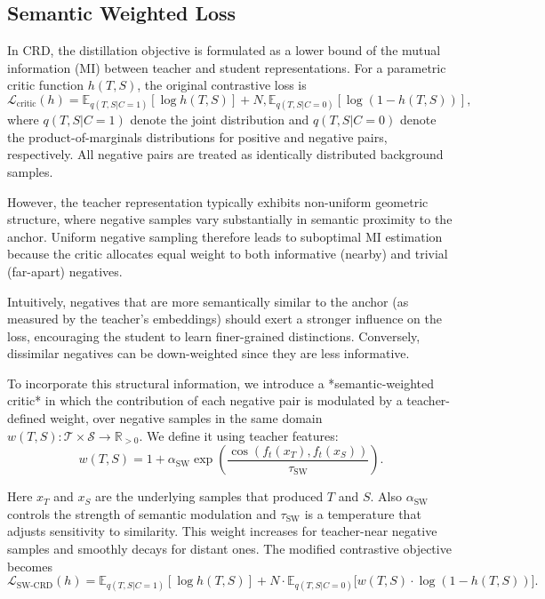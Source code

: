 \documentclass{article}
\theoremstyle{plain}
\theoremstyle{remark}
\begin{document}
\subsection{Semantic Weighted Loss}

In CRD, the distillation objective is formulated as a lower bound of the mutual information (MI) between teacher and student representations. For a parametric critic function $h(T,S)$, the original contrastive loss is
\begin{equation}
    \mathcal{L}_{\text{critic}}(h) =
    \mathbb{E}_{q(T,S|C=1)}[\log h(T,S)]
    +
    N,\mathbb{E}_{q(T,S|C=0)}[\log(1 - h(T,S))],
\end{equation}
where $q(T,S|C=1)$ denote the joint distribution and $q(T,S|C=0)$ denote the product-of-marginals distributions for positive and negative pairs, respectively. All negative pairs are treated as identically distributed background samples.

However, the teacher representation typically exhibits non-uniform geometric structure, where negative samples vary substantially in semantic proximity to the anchor. Uniform negative sampling therefore leads to suboptimal MI estimation because the critic allocates equal weight to both informative (nearby) and trivial (far-apart) negatives.

Intuitively, negatives that are more semantically similar to the anchor (as measured by the teacher’s embeddings) should exert a stronger influence on the loss, encouraging the student to learn finer-grained distinctions. Conversely, dissimilar negatives can be down-weighted since they are less informative.

To incorporate this structural information, we introduce a *semantic-weighted critic* in which the contribution of each negative pair is modulated by a teacher-defined weight, over negative samples in the same domain $w(T,S) : \mathcal{T} \times \mathcal{S} \rightarrow \mathbb{R}_{>0}$. We define it using teacher features:
\begin{equation}
w(T,S)
=
1 + \alpha_{\text{SW}} \exp \left( \frac{\cos(f_t(x_T), f_t(x_S))}{\tau_{\text{SW}}} \right).
\label{def:semantic-weights}
\end{equation}

Here $x_T$ and $x_S$ are the underlying samples that produced $T$ and $S$. Also $\alpha_{\text{SW}}$ controls the strength of semantic modulation and $\tau_{\text{SW}}$ is a temperature that adjusts sensitivity to similarity. This weight increases for teacher-near negative samples and smoothly decays for distant ones. The modified contrastive objective becomes
\begin{equation}
\mathcal{L}_{\text{SW-CRD}}(h)
=
\mathbb{E}_{q(T,S|C=1)}[\log h(T,S)]
+
N \cdot \mathbb{E}_{q(T,S|C=0)}\big[
w(T, S) \cdot \log(1 - h(T,S))
\big].
\end{equation}
\end{document}
